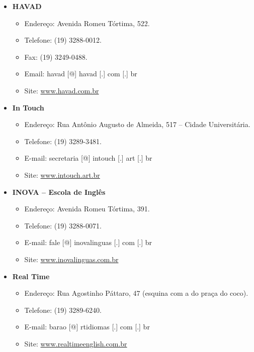 \begin{itemize}
\item  \textbf{HAVAD}
\begin{itemize}
\item  Endereço: Avenida Romeu Tórtima, 522.
\item  Telefone: (19) 3288-0012.
\item  Fax: (19) 3249-0488.
\item  Email: havad [@] havad [.] com [.] br
\item  Site: \url{www.havad.com.br}
\end{itemize}
\end{itemize}

\begin{itemize}
\item  \textbf{In Touch}
\begin{itemize}
\item  Endereço: Rua Antônio Augusto de Almeida, 517 -- Cidade Universitária.
\item  Telefone: (19) 3289-3481.
\item  E-mail: secretaria [@] intouch [.] art [.] br
\item  Site: \url{www.intouch.art.br}
\end{itemize}
\end{itemize}

\begin{itemize}
\item  \textbf{INOVA -- Escola de Inglês}
\begin{itemize}
\item  Endereço: Avenida Romeu Tórtima, 391.
\item  Telefone: (19) 3288-0071.
\item  E-mail: fale [@] inovalinguas [.] com [.] br
\item  Site: \url{www.inovalinguas.com.br}
\end{itemize}
\end{itemize}

\begin{itemize}
\item  \textbf{Real Time}
\begin{itemize}
\item  Endereço: Rua Agostinho Páttaro, 47 (esquina com a do praça do coco).
\item  Telefone: (19) 3289-6240.
\item  E-mail: barao [@] rtidiomas [.] com [.] br
\item  Site: \url{www.realtimeenglish.com.br}
\end{itemize}
\end{itemize}

